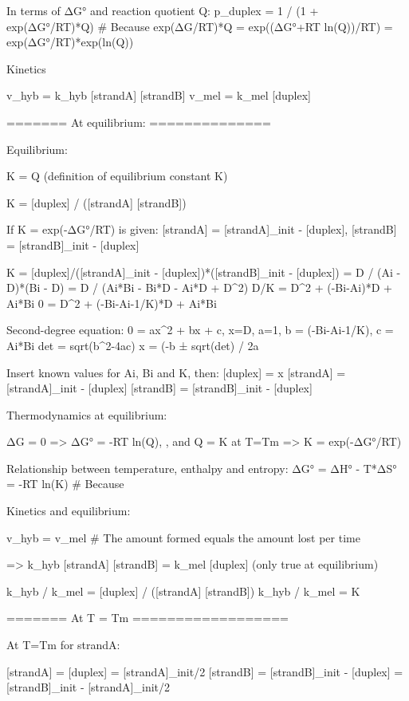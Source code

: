     In terms of ΔG° and reaction quotient Q:
        p_duplex = 1 / (1 + exp(ΔG°/RT)*Q)      # Because exp(ΔG/RT)*Q = exp((ΔG°+RT ln(Q))/RT) = exp(ΔG°/RT)*exp(ln(Q))


Kinetics

    v_hyb = k_hyb [strandA] [strandB]
    v_mel = k_mel [duplex]



======= At equilibrium: ==============


Equilibrium:

    K = Q   (definition of equilibrium constant K)

    K = [duplex] / ([strandA] [strandB])


If K = exp(-ΔG°/RT) is given:
    [strandA] = [strandA]_init - [duplex], [strandB] = [strandB]_init - [duplex]

    K   = [duplex]/([strandA]_init - [duplex])*([strandB]_init - [duplex])
        = D / (Ai - D)*(Bi - D) = D / (Ai*Bi - Bi*D - Ai*D + D^2)
    D/K = D^2 + (-Bi-Ai)*D + Ai*Bi
     0  = D^2 + (-Bi-Ai-1/K)*D + Ai*Bi

    Second-degree equation:
        0 = ax^2 + bx + c,      x=D, a=1, b = (-Bi-Ai-1/K), c = Ai*Bi
        det = sqrt(b^2-4ac)
        x = (-b ± sqrt(det) / 2a

    Insert known values for Ai, Bi and K, then:
        [duplex] = x
        [strandA] = [strandA]_init - [duplex]
        [strandB] = [strandB]_init - [duplex]



Thermodynamics at equilibrium:

    ΔG = 0
    => ΔG° = -RT ln(Q),     , and Q = K at T=Tm
    => K = exp(-ΔG°/RT)

    Relationship between temperature, enthalpy and entropy:
    ΔG° = ΔH° - T*ΔS°
        = -RT ln(K)         # Because

Kinetics and equilibrium:


    v_hyb = v_mel            # The amount formed equals the amount lost per time

    =>  k_hyb [strandA] [strandB] = k_mel [duplex]          (only true at equilibrium)

        k_hyb / k_mel = [duplex] / ([strandA] [strandB])
        k_hyb / k_mel = K




======= At T = Tm ==================

At T=Tm for strandA:

    [strandA] = [duplex] = [strandA]_init/2
    [strandB] = [strandB]_init - [duplex] = [strandB]_init - [strandA]_init/2

